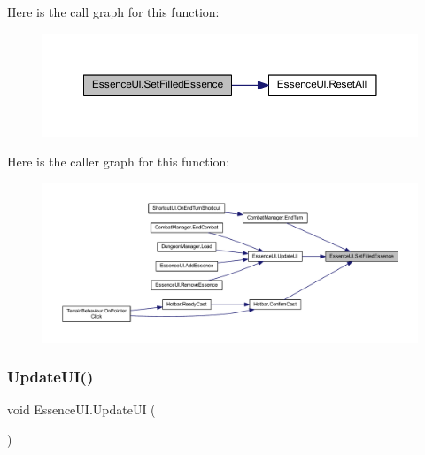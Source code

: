 Here is the call graph for this function\+:
\nopagebreak
\begin{figure}[H]
\begin{center}
\leavevmode
\includegraphics[width=350pt]{class_essence_u_i_aac12f1c82310ceb94e259d9b6aa9bdfd_cgraph}
\end{center}
\end{figure}
Here is the caller graph for this function\+:
\nopagebreak
\begin{figure}[H]
\begin{center}
\leavevmode
\includegraphics[width=350pt]{class_essence_u_i_aac12f1c82310ceb94e259d9b6aa9bdfd_icgraph}
\end{center}
\end{figure}
\mbox{\label{class_essence_u_i_a26023c3d4977188014384a1a40eb3ad9}} 
\subsubsection{\texorpdfstring{UpdateUI()}{UpdateUI()}}
{\footnotesize\ttfamily void Essence\+U\+I.\+Update\+UI (\begin{DoxyParamCaption}{ }\end{DoxyParamCaption})}

